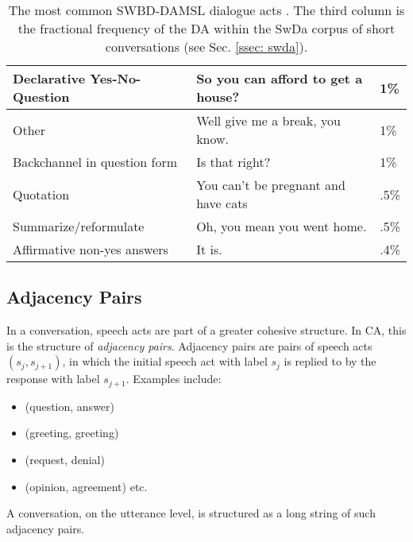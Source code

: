 \begin{table}[t]
\begin{tabular}{|l|l|l|}
            Declarative Yes-No-Question  & So you can afford to get a house?               & 1\%         \\ \hline
            Other                        & Well give me a break, you know.                 & 1\%         \\ \hline
            Backchannel in question form & Is that right?                                  & 1\%         \\ \hline
            Quotation                    & You can't be pregnant and have cats             & .5\%        \\ \hline
            Summarize/reformulate        & Oh, you mean you went home.                     & .5\%        \\ \hline
            Affirmative non-yes answers  & It is.                                          & .4\%        \\ \hline
        \end{tabular}
        \caption{The most common SWBD-DAMSL dialogue acts \cite{swda}. The third column is the fractional frequency of the DA within the SwDa corpus of short conversations (see Sec. \ref{ssec: swda}).}
        \label{table: damsl das}
        \end{table}

    
    \subsection{Adjacency Pairs \label{ssec: adjacency pairs}}
        
        In a conversation, speech acts are part of a greater cohesive structure. In CA, this is the structure of \textit{adjacency pairs}. Adjacency pairs are pairs of speech acts $(s_j, s_{j+1})$, in which the initial speech act with label $s_j$ is replied to by the response with label $s_{j+1}$. Examples include:
        \begin{itemize}
            \item (question, answer)
            \item (greeting, greeting)
            \item (request, denial)
            \item (opinion, agreement) etc.
        \end{itemize}
    
        A conversation, on the utterance level, is structured as a long string of such adjacency pairs.
        
    
    